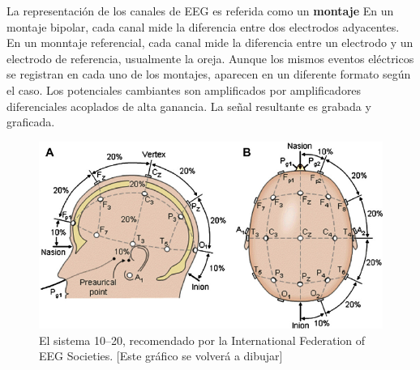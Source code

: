 La representaci\'on de los canales de EEG es referida como un \textbf{montaje}
En un montaje bipolar, cada canal mide la diferencia entre dos electrodos adyacentes.
En un monntaje referencial, cada canal mide la diferencia entre un electrodo y un electrodo
de referencia, usualmente la oreja.
Aunque los mismos eventos el\'ectricos se registran en cada uno de los montajes,
aparecen en un diferente formato seg\'un el caso. Los potenciales cambiantes
son amplificados por amplificadores diferenciales acoplados de alta ganancia.
La se\~nal resultante es grabada y graficada.

\begin{figure}
\centering
\includegraphics[width=0.8\linewidth]{Fig.png} 
\caption{El sistema 10--20, recomendado por la
International Federation of EEG Societies. [Este gr\'afico se volver\'a a dibujar]
}
\label{img1020}
\end{figure}


